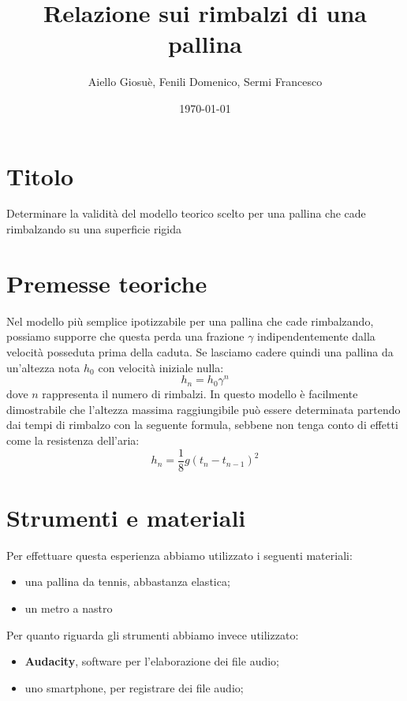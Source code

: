 \documentclass{article}
\title{Relazione sui rimbalzi di una pallina}
\author{Aiello Giosuè, Fenili Domenico, Sermi Francesco}
\date{\today}
\begin{document}
\maketitle
\pagebreak
\tableofcontents
\pagebreak
\section{Titolo}
Determinare la validità del modello teorico scelto per una pallina che cade rimbalzando su una superficie rigida
\section{Premesse teoriche}
Nel modello più semplice ipotizzabile per una pallina che cade rimbalzando, possiamo supporre che questa perda una frazione $\gamma$ indipendentemente dalla velocità posseduta prima della caduta. Se lasciamo cadere quindi una pallina da un'altezza nota $h_0$ con velocità iniziale nulla:
\begin{equation}
	h_n = h_0 \gamma ^n
\end{equation}
dove $n$ rappresenta il numero di rimbalzi. In questo modello è facilmente dimostrabile che l'altezza massima raggiungibile può essere determinata partendo dai tempi di rimbalzo con la seguente formula, sebbene non tenga conto di effetti come la resistenza dell'aria:
\begin{equation}
	h_n = \frac{1}{8} g (t_n - t_{n-1})^2
\end{equation}
\section{Strumenti e materiali}
Per effettuare questa esperienza abbiamo utilizzato i seguenti materiali:
\begin{itemize}
	\item una pallina da tennis, abbastanza elastica;
	\item un metro a nastro
\end{itemize}
Per quanto riguarda gli strumenti abbiamo invece utilizzato:
\begin{itemize}
	\item \textbf{Audacity}, software per l'elaborazione dei file audio;
	\item uno smartphone, per registrare dei file audio;
\end{itemize}
\end{document}
